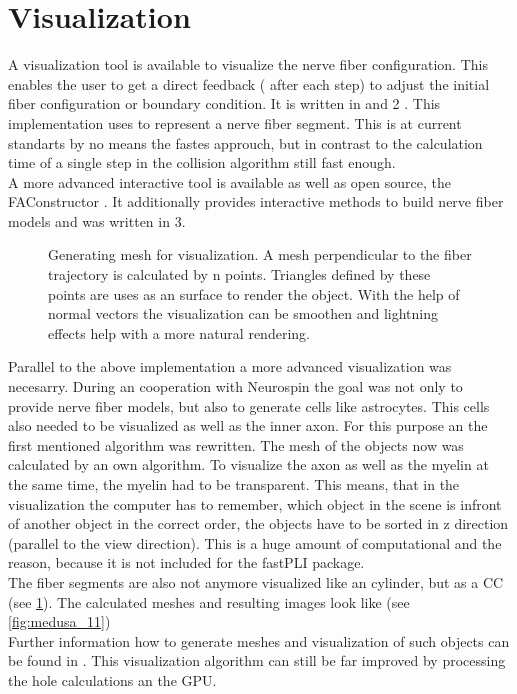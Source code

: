 \section{Visualization}\label{sec:visualization}
%
%
%
A visualization tool is available to visualize the nerve fiber configuration.
This enables the user to get a direct feedback (\eg{} after each step) to adjust the initial fiber configuration or boundary condition.
It is written in \cpp{} and \opengl{} 2 \cite{isocpp, khronos}.
This implementation uses  to represent a nerve fiber segment.
This is at current standarts by no means the fastes approuch, but in contrast to the calculation time of a single step in the collision algorithm still fast enough.
\\
A more advanced interactive tool is available as well as open source, the FAConstructor \cite{Reuter2019}.
It additionally provides interactive methods to build nerve fiber models and was written in \opengl{} 3.
\par
%
%
\begin{figure}[!t]
    \centering
    \setlength{\tikzwidth}{0.75\textwidth}
	\caption[Nerve fiber visualization example]{Generating mesh for visualization. A mesh perpendicular to the fiber trajectory is calculated by n points. Triangles defined by these points are uses as an surface to render the object. With the help of normal vectors the visualization can be smoothen and lightning effects help with a more natural rendering.}
	\label{fig:vis_mesh}
\end{figure}
%
Parallel to the above implementation a more advanced visualization was necesarry.
During an cooperation with Neurospin \dummy{} the goal was not only to provide nerve fiber models, but also to generate cells like astrocytes.
This cells also needed to be visualized as well as the inner axon.
For this purpose an the first mentioned algorithm was rewritten.
The mesh of the objects now was calculated by an own algorithm.
To visualize the axon as well as the myelin at the same time, the myelin had to be transparent.
This means, that in the visualization the computer has to remember, which object in the scene is infront of another object in the correct order, \ie{} the objects have to be sorted in z direction (parallel to the view direction).
This is a huge amount of computational \dummy{} and the reason, because it is not included for the \ac{fastPLI} package.
\\
The fiber segments are also not anymore visualized like an cylinder, but as a \ac{CC} (see \cref{fig:vis_mesh}).
The calculated meshes and resulting images look like (see \cref{fig:medusa_11})
\\
Further information how to generate meshes and visualization of such objects can be found in \dummy{}.
This visualization algorithm can still be far improved by processing the hole calculations an the \ac{GPU}.
%
% 
% 
